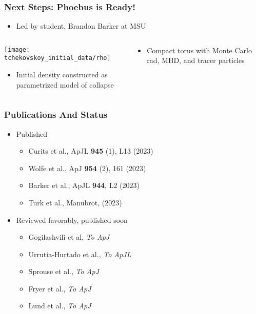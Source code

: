 \documentclass[]{beamer}
\begin{document}
\begin{frame}
  \frametitle{Next Steps: Phoebus is Ready!}
  \begin{itemize}
  \item Led by student, Brandon Barker at MSU
  \end{itemize}
  \begin{columns}
    \begin{column}{6cm}
      \begin{center}
        \texttt{[image: tchekovskoy\_initial\_data/rho]}
      \end{center}
      \begin{itemize}
      \item Initial density constructed as parametrized model of collapse
      \end{itemize}
    \end{column}
    \begin{column}{6cm}
      \begin{center}
      \end{center}
      \begin{itemize}
      \item Compact torus with Monte Carlo rad, MHD, and tracer particles
      \end{itemize}
    \end{column}
  \end{columns}
\end{frame}

\begin{frame}
  \frametitle{Publications And Status}
  \begin{itemize}
  \item Published
    \begin{itemize}
    \item Curits et al., ApJL \textbf{945} (1), L13 (2023)
    \item Wolfe et al., ApJ \textbf{954} (2), 161 (2023)
    \item Barker et al., ApJL \textbf{944}, L2 (2023)
    \item Turk et al., Manubrot, (2023)
    \end{itemize}
  \item Reviewed favorably, published soon
    \begin{itemize}
    \item Gogilashvili et al, \textit{To ApJ}
    \item Urrutia-Hurtado et al., \textit{To ApJL}
    \item Sprouse et al., \textit{To ApJ}
    \item Fryer et al., \textit{To ApJ}
    \item Lund et al., \textit{To ApJ}
    \end{itemize}
  \end{itemize}
\end{frame}
\end{document}
